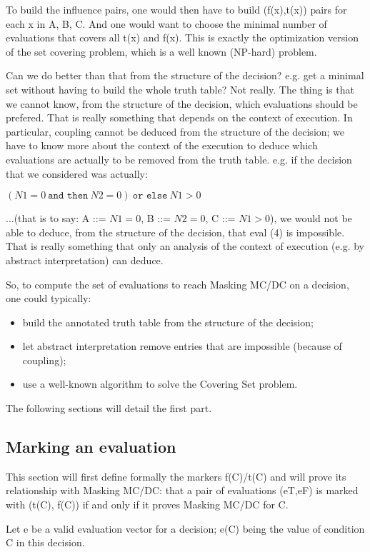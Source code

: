 \documentclass[a4paper,12pt,twoside]{article}
\newcommand{\andthen}{\texttt{and then}}
\newcommand{\orelse}{\texttt{or else}}
\begin{document}
To build the influence pairs, one would then have to build (f(x),t(x))
pairs for each x in {A, B, C}. And one would want to choose the
minimal number of evaluations that covers all t(x) and f(x). This is
exactly the optimization version of the set covering problem, which is
a well known (NP-hard) problem.

Can we do better than that from the structure of the decision? e.g.
get a minimal set without having to build the whole truth table? Not
really. The thing is that we cannot know, from the structure of the
decision, which evaluations should be prefered. That is really
something that depends on the context of execution. In particular,
coupling cannot be deduced from the structure of the decision; we have
to know more about the context of the execution to deduce which
evaluations are actually to be removed from the truth table. e.g. if
the decision that we considered was actually:

$(N1 = 0 \ \andthen{} \ N2 = 0) \ \orelse{} \ N1 > 0$

...(that is to say: A ::= $N1 = 0$, B ::= $N2 = 0$, C ::= $N1 > 0$),
we would not be able to deduce, from the structure of the decision,
that eval (4) is impossible. That is really something that only an
analysis of the context of execution (e.g. by abstract interpretation)
can deduce.

So, to compute the set of evaluations to reach Masking MC/DC on a decision,
one could typically:
\begin{itemize}
\item build the annotated truth table from the structure of the decision;
\item let abstract interpretation remove entries that are impossible
      (because of coupling);
\item use a well-known algorithm to solve the Covering Set problem.
\end{itemize}

The following sections will detail the first part.

\subsection{Marking an evaluation}

This section will first define formally the markers f(C)/t(C) and
will prove its relationship with Masking MC/DC: that a pair of
evaluations (eT,eF) is marked with (t(C), f(C)) if and only if
it proves Masking MC/DC for C.

Let e be a valid evaluation vector for a decision; e(C) being the
value of condition C in this decision.
\end{document}
